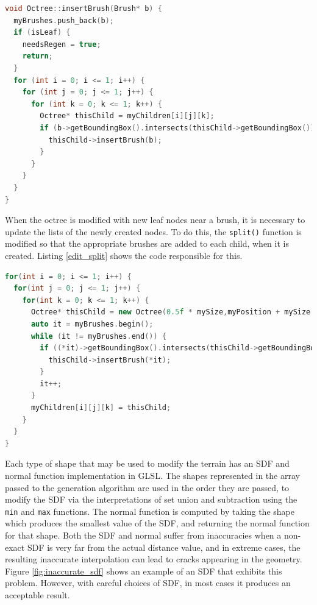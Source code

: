 \documentclass{article}
\begin{document}
\begin{lstlisting}[language=C++,label={edit_add},caption={Code to add a new brush into the octree. The brush is added recursively to lists at all levels, so that each leaf has a list of exactly the brushes that are partially inside it. The flag \texttt{needsRegen} indicates to the octree updating algorithm that the geometry within the chunk has changed, and needs to be regenerated.}]
void Octree::insertBrush(Brush* b) {
  myBrushes.push_back(b);
  if (isLeaf) {
    needsRegen = true;
    return;
  }
  for (int i = 0; i <= 1; i++) {
    for (int j = 0; j <= 1; j++) {
      for (int k = 0; k <= 1; k++) {
        Octree* thisChild = myChildren[i][j][k];
        if (b->getBoundingBox().intersects(thisChild->getBoundingBox())) {
          thisChild->insertBrush(b);
        }
      }
    }
  }
}
\end{lstlisting}

When the octree is modified with new leaf nodes near a brush, it is necessary to update the lists of the newly created nodes. To do this, the \texttt{split()} function is modified so that the appropriate brushes are added to each child, when it is created. Listing \ref{edit_split} shows the code responsible for this.

\begin{lstlisting}[language=C++,label={edit_split},caption={Snippet from \texttt{split}, showing how brushes are associated with child nodes, when they are created.}]
for(int i = 0; i <= 1; i++) {
  for(int j = 0; j <= 1; j++) {
    for(int k = 0; k <= 1; k++) {
      Octree* thisChild = new Octree(0.5f * mySize,myPosition + mySize * 0.5f * glm::vec3(i,j,k), myDetailLevel + 1,myGenerator,this,glm::uvec3(i,j,k));
      auto it = myBrushes.begin();
      while (it != myBrushes.end()) {
        if ((*it)->getBoundingBox().intersects(thisChild->getBoundingBox())) {
          thisChild->insertBrush(*it);
        }
        it++;
      }
      myChildren[i][j][k] = thisChild;
    }
  }
}
\end{lstlisting}

Each type of shape that may be used to modify the terrain has an SDF and normal function implementation in GLSL. The shapes represented in the array passed to the generation algorithm are used in the order they are passed, to modify the SDF via the interpretations of set union and subtraction using the \texttt{min} and \texttt{max} functions. The normal function is computed by taking the shape which produces the smallest value of the SDF, and returning the normal function for that shape. Both the SDF and normal suffer from inaccuracies when a non-exact SDF is very far from the actual distance value, and in extreme cases, the resulting inaccurate interpolation can lead to cracks appearing in the geometry. Figure \ref{fig:inaccurate_sdf} shows an example of an SDF that exhibits this problem. However, with careful choices of SDF, in most cases it produces an acceptable result.
\end{document}

